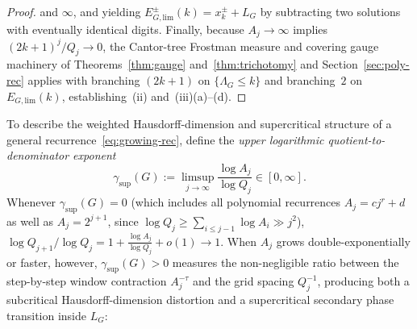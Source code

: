 \documentclass[11pt]{article}
\theoremstyle{definition}
\theoremstyle{remark}
\newcommand{\Lam}{\Lambda}
\begin{document}
\begin{proof}
and $\infty$, and yielding $E_{G,\mathrm{lim}}^\pm(k)=x_k^\pm+L_G$ by subtracting
two solutions with eventually identical digits. Finally, because $A_j\to\infty$
implies $(2k+1)^j/Q_j\to0$, the Cantor-tree Frostman measure and covering gauge
machinery of Theorems~\ref{thm:gauge} and~\ref{thm:trichotomy} and Section~\ref{sec:poly-rec}
applies with branching $(2k+1)$ on $\{\Lam_G\le k\}$ and branching~$2$ on
$E_{G,\mathrm{lim}}(k)$, establishing~(ii) and~(iii)(a)--(d).
\end{proof}

To describe the weighted Hausdorff-dimension and supercritical structure of a
general recurrence~\eqref{eq:growing-rec}, define the \emph{upper logarithmic
quotient-to-denominator exponent}
\begin{equation}\label{eq:gamma-sup}
\gamma_{\sup}(G):=\limsup_{j\to\infty}\frac{\log A_j}{\log Q_j}\in[0,\infty].
\end{equation}
Whenever $\gamma_{\sup}(G)=0$ (which includes all polynomial recurrences
$A_j=cj^r+d$ as well as $A_j=2^{j+1}$, since $\log Q_j\ge\sum_{i\le j-1}\log A_i\gg j^2$),
$\log Q_{j+1}/\log Q_j=1+\frac{\log A_j}{\log Q_j}+o(1)\to1$. When $A_j$ grows
double-exponentially or faster, however, $\gamma_{\sup}(G)>0$ measures the
non-negligible ratio between the step-by-step window contraction $A_j^{-\tau}$ and
the grid spacing $Q_j^{-1}$, producing both a subcritical Hausdorff-dimension
distortion and a supercritical secondary phase transition inside $L_G$:
\end{document}
